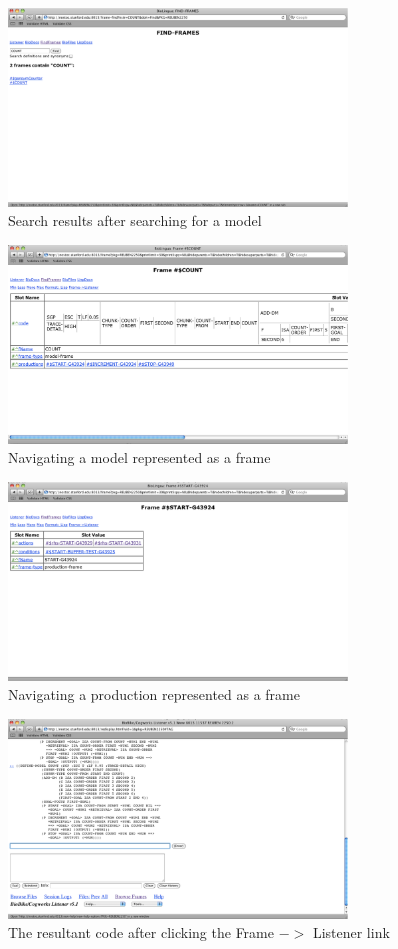 \begin{figure}[htp]
  \centering
  \includegraphics[width=90mm]{SearchForModel}
  \caption{Search results after searching for a model}
  \label{SearchForModel}
\end{figure}

\begin{figure}[htp]
  \centering
  \includegraphics[width=90mm]{NavigateFrame}
  \caption{Navigating a model represented as a frame}
  \label{NavigateFrame}
\end{figure}

\begin{figure}[htp]
  \centering
  \includegraphics[width=90mm]{NavigatingAProduction}
  \caption{Navigating a production represented as a frame}
  \label{NavigatingAProduction}
\end{figure}

\begin{figure}[htp]
  \centering
  \includegraphics[width=90mm]{ConvertFrameToImage}
  \caption{The resultant code after clicking the Frame $->$ Listener
    link}
  \label{ConvertFrameToImage}
\end{figure}



